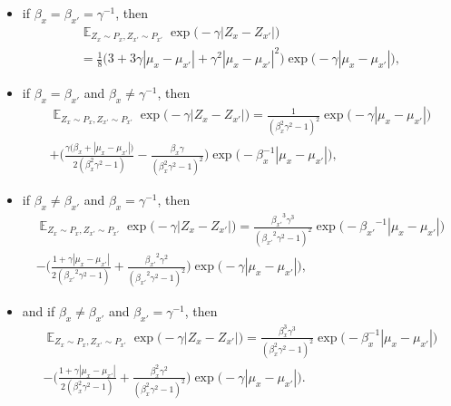 \documentclass{article}
\DeclareMathOperator{\Exp}{\mathbb{E}}
\begin{document}
\begin{itemize}
    \item if $\beta_x = \beta_{x'} = \gamma^{-1}$, then
    \begin{multline*}
        \Exp_{Z_x \sim P_x, Z_{x'} \sim P_{x'}} \exp{\big(-\gamma |Z_x-Z_{x'}|\big)} \\
        = \frac{1}{8}\Big(3 + 3 \gamma |\mu_x-\mu_{x'}|+ \gamma^2 {|\mu_x - \mu_{x'}|}^2\Big) \exp{\big(-\gamma |\mu_x-\mu_{x'}|\big)},
    \end{multline*}
    \item if $\beta_x = \beta_{x'}$ and $\beta_x \neq \gamma^{-1}$, then
    \begin{multline*}
        \Exp_{Z_x \sim P_x, Z_{x'} \sim P_{x'}} \exp{\big(-\gamma |Z_x-Z_{x'}|\big)}
        = \frac{1}{{(\beta_x^2 \gamma^2 - 1)}^2} \exp{\big(-\gamma |\mu_x-\mu_{x'}|\big)} \\
        + \bigg(\frac{\gamma \big(\beta_x + |\mu_x - \mu_{x'}|\big)}{2(\beta_x^2 \gamma^2 - 1)} - \frac{\beta_x \gamma}{{(\beta_x^2 \gamma^2 - 1)}^2} \bigg) \exp{\Big(-\beta_x^{-1} |\mu_x-\mu_{x'}|\Big)},
    \end{multline*}
    \item if $\beta_x \neq \beta_{x'}$ and $\beta_x = \gamma^{-1}$, then
    \begin{multline*}
        \Exp_{Z_x \sim P_x, Z_{x'} \sim P_{x'}} \exp{\big(-\gamma |Z_x-Z_{x'}| \big)}
        = \frac{{\beta_{x'}}^3 \gamma^3}{{({\beta_{x'}}^2 \gamma^2 - 1)}^2} \exp{\Big(- {\beta_{x'}}^{-1} |\mu_x-\mu_{x'}| \Big)} \\
        - \bigg(\frac{1 + \gamma |\mu_x - \mu_{x'}|}{2({\beta_{x'}}^2 \gamma^2 - 1)} + \frac{{\beta_{x'}}^2\gamma^2}{{({\beta_{x'}}^2 \gamma^2 - 1)}^2} \bigg) \exp{\big(-\gamma |\mu_x-\mu_{x'}| \big)},
    \end{multline*}
    \item and if $\beta_x \neq \beta_{x'}$ and $\beta_{x'} = \gamma^{-1}$, then
    \begin{multline*}
        \Exp_{Z_x \sim P_x, Z_{x'} \sim P_{x'}} \exp{\Big(-\gamma |Z_x - Z_{x'}| \Big)}
        = \frac{\beta_x^3 \gamma^3}{{(\beta_x^2 \gamma^2 - 1)}^2} \exp{\Big(-\beta_x^{-1} |\mu_x-\mu_{x'}| \Big)} \\
        - \bigg(\frac{1 + \gamma|\mu_x - \mu_{x'}|}{2(\beta_x^2 \gamma^2 - 1)} + \frac{\beta_x^2 \gamma^2}{{(\beta_x^2 \gamma^2 - 1)}^2} \bigg) \exp{\big(-\gamma |\mu_x-\mu_{x'}| \big)}.
    \end{multline*}
\end{itemize}
\end{document}
